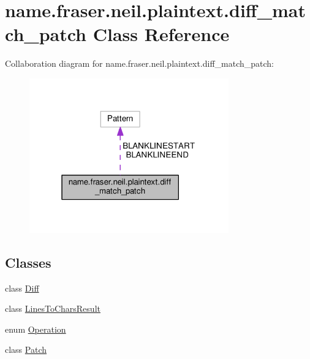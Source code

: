 \hypertarget{classname_1_1fraser_1_1neil_1_1plaintext_1_1diff__match__patch}{}\section{name.\+fraser.\+neil.\+plaintext.\+diff\+\_\+match\+\_\+patch Class Reference}
\label{classname_1_1fraser_1_1neil_1_1plaintext_1_1diff__match__patch}


Collaboration diagram for name.\+fraser.\+neil.\+plaintext.\+diff\+\_\+match\+\_\+patch\+:
\nopagebreak
\begin{figure}[H]
\begin{center}
\leavevmode
\includegraphics[width=244pt]{classname_1_1fraser_1_1neil_1_1plaintext_1_1diff__match__patch__coll__graph}
\end{center}
\end{figure}
\subsection*{Classes}
\begin{DoxyCompactItemize}
\item 
class \hyperlink{classname_1_1fraser_1_1neil_1_1plaintext_1_1diff__match__patch_1_1Diff}{Diff}
\item 
class \hyperlink{classname_1_1fraser_1_1neil_1_1plaintext_1_1diff__match__patch_1_1LinesToCharsResult}{Lines\+To\+Chars\+Result}
\item 
enum \hyperlink{enumname_1_1fraser_1_1neil_1_1plaintext_1_1diff__match__patch_1_1Operation}{Operation}
\item 
class \hyperlink{classname_1_1fraser_1_1neil_1_1plaintext_1_1diff__match__patch_1_1Patch}{Patch}
\end{DoxyCompactItemize}
